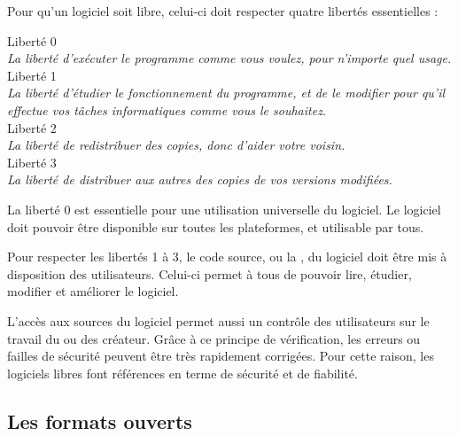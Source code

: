 
Pour qu’un logiciel soit libre, celui-ci doit respecter quatre libertés essentielles :

\begin{center}
\begin{minipage}{0.8\textwidth}
\begin{center}
\textcolor{Cdl}{\large Liberté 0} \\ \textit{La liberté d'exécuter le programme comme vous voulez, pour n'importe quel usage.} \\
\textcolor{Cdl}{\large Liberté 1} \\ \textit{La liberté d'étudier le fonctionnement du programme, et de le modifier pour qu'il effectue vos tâches informatiques comme vous le souhaitez.} \\
\textcolor{Cdl}{\large Liberté 2} \\ \textit{La liberté de redistribuer des copies, donc d'aider votre voisin.} \\
\textcolor{Cdl}{\large Liberté 3} \\ \textit{La liberté de distribuer aux autres des copies de vos versions modifiées.}
\end{center}
\end{minipage}
\end{center}

La \textcolor{Cdl}{liberté 0} est essentielle pour une utilisation universelle du logiciel. Le logiciel doit pouvoir être disponible sur toutes les plateformes, et utilisable par tous.

\Separateur

Pour respecter les \textcolor{Cdl}{libertés 1 à 3}, le code source, ou la , du logiciel doit être mis à disposition des utilisateurs. Celui-ci permet à tous de pouvoir lire, étudier, modifier et améliorer le logiciel. 

\Separateur

L’accès aux \textcolor{Cdl}{sources} du logiciel permet aussi un contrôle des utilisateurs sur le travail du ou des créateur. Grâce à ce principe de vérification, les erreurs ou failles de sécurité peuvent être très rapidement corrigées. Pour cette raison, les logiciels libres font références en terme de sécurité et de fiabilité.

\subsection{Les formats ouverts}

